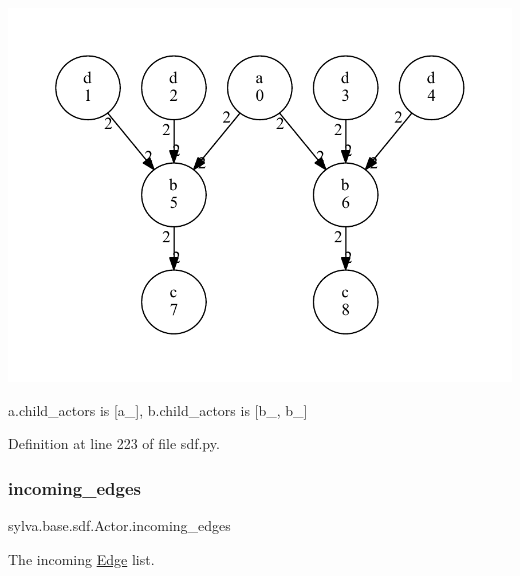 \begin{DoxyImage}
\includegraphics[width=\textwidth,height=\textheight/2,keepaspectratio=true]{dot_HSDFG_example}
\end{DoxyImage}
 {\ttfamily a.\+child\+\_\+actors} is {\ttfamily \mbox{[}a\+\_\mbox{]}}, {\ttfamily b.\+child\+\_\+actors} is {\ttfamily \mbox{[}b\+\_, b\+\_\mbox{]}} 

Definition at line 223 of file sdf.\+py.

\mbox{\label{classsylva_1_1base_1_1sdf_1_1_actor_a369e42539c2f6dbefafd3ab543428404}} 
\subsubsection{\texorpdfstring{incoming\+\_\+edges}{incoming\_edges}}
{\footnotesize\ttfamily sylva.\+base.\+sdf.\+Actor.\+incoming\+\_\+edges}



The incoming \hyperlink{classsylva_1_1base_1_1sdf_1_1_edge}{Edge} list. 

